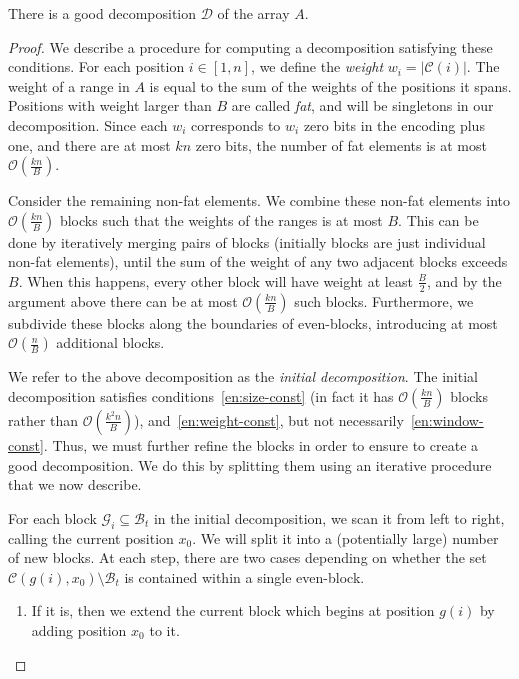 \documentclass[runningheads]{llncs}
\newcommand{\opset}{\mathcal{C}}
\newcommand{\Oh}{\mathcal{O}}
\begin{document}
\begin{lemma}\label{lem:decomposition}
There is a good decomposition $\mathcal{D}$ of the array $A$.
\end{lemma}

\begin{proof}
We describe a procedure for computing a decomposition satisfying these
conditions.  For each position $i \in [1,n]$, we define the
\emph{weight} $w_i = |\opset(i)|$.  The weight of a range in $A$ is
equal to the sum of the weights of the positions it spans. Positions
with weight larger than $B$ are called \emph{fat}, and will be
singletons in our decomposition.  Since each $w_i$ corresponds to
$w_i$ zero bits in the encoding plus one, and there are at most $kn$
zero bits, the number of fat elements is at most $\Oh(\frac{kn}{B})$.

Consider the remaining non-fat elements.  We combine these non-fat
elements into $\Oh(\frac{kn}{B})$ blocks such that the weights of the ranges
is at most $B$.  This can be done by iteratively merging pairs of
blocks (initially blocks are just individual non-fat elements), until
the sum of the weight of any two adjacent blocks exceeds $B$.  When
this happens, every other block will have weight at least $\frac{B}{2}$, and
by the argument above there can be at most $\Oh(\frac{kn}{B})$ such blocks.
Furthermore, we subdivide these blocks along the boundaries of
even-blocks, introducing at most $\Oh(\frac{n}{B})$ additional blocks.  

We refer to the above decomposition as the \emph{initial
  decomposition}.  The initial decomposition satisfies
conditions~\ref{en:size-const} (in fact it has $\Oh(\frac{kn}{B})$ blocks
rather than $\Oh(\frac{k^2n}{B})$), and~\ref{en:weight-const}, but not
necessarily~\ref{en:window-const}.  Thus, we must further refine the
blocks in order to ensure to create a good decomposition.  We do this by
splitting them using an iterative procedure that we now describe.

For each block $\mathcal{G}_i \subseteq \mathcal{B}_t$ in the
initial decomposition, we scan it from left to right, calling the
current position $x_0$.  We will split it into a (potentially large)
number of new blocks.  At each step, there are two cases depending on
whether the set $\opset(g(i), x_0) \setminus \mathcal{B}_t$ is
contained within a single even-block.  
\begin{enumerate}

\item If it is, then we extend the current block which begins at
  position $g(i)$ by adding position $x_0$ to it.


\end{enumerate}
\end{proof}
\end{document}
